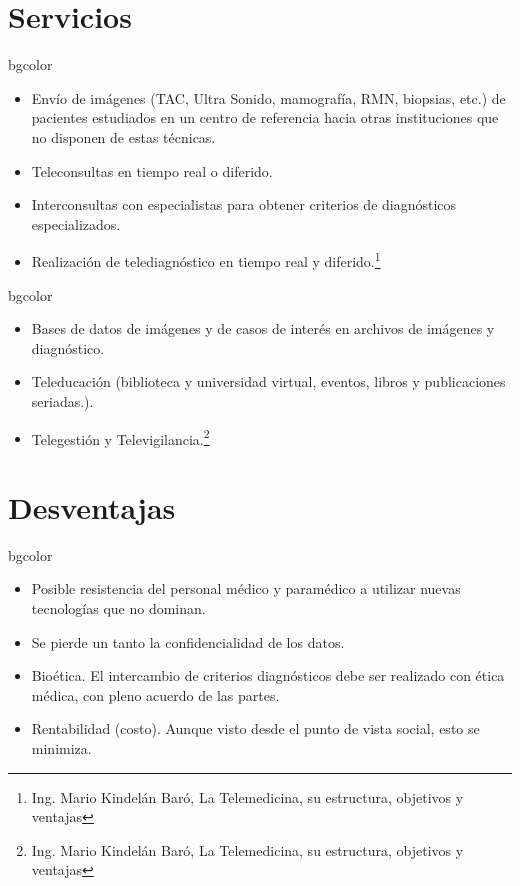 \documentclass[xcolor=svgnames]{beamer}
\begin{document}
\section{Servicios}
\begin{frame}
\begin{beamercolorbox}[rounded=true, center, shadow=true]{bgcolor}
  \begin{itemize}
   \item Envío de imágenes (TAC, Ultra Sonido, mamografía, RMN, biopsias, etc.) de pacientes estudiados en un centro de referencia hacia otras instituciones que no disponen de estas técnicas.\pause
   \item Teleconsultas en tiempo real o diferido.\pause
   \item Interconsultas con especialistas para obtener criterios de diagnósticos especializados.\pause
   \item Realización de telediagnóstico en tiempo real y diferido.\footnote{Ing. Mario Kindelán Baró, La Telemedicina, su estructura, objetivos y ventajas}
  \end{itemize}
\end{beamercolorbox}
\end{frame}
\begin{frame}
\begin{beamercolorbox}[rounded=true, center, shadow=true]{bgcolor}
  \begin{itemize}
   \item Bases de datos de imágenes y de casos de interés en archivos de imágenes y diagnóstico.\pause
   \item Teleducación (biblioteca y universidad virtual, eventos, libros y publicaciones seriadas.).\pause
   \item Telegestión y Televigilancia.\footnote{Ing. Mario Kindelán Baró, La Telemedicina, su estructura, objetivos y ventajas}
  \end{itemize}
\end{beamercolorbox}
\end{frame}

\section{Desventajas}
\begin{frame}
\begin{beamercolorbox}[rounded=true, center, shadow=true]{bgcolor}
\begin{itemize}
 \item Posible resistencia del personal médico y paramédico a utilizar nuevas tecnologías que no dominan.\pause
 \item Se pierde un tanto la confidencialidad de los datos.\pause
 \item Bioética. El intercambio de criterios diagnósticos debe ser realizado con ética médica, con pleno acuerdo de las partes.\pause
 \item Rentabilidad (costo). Aunque visto desde el punto de vista social, esto se minimiza.
\end{itemize}
\end{beamercolorbox}
\end{frame}
\end{document}
